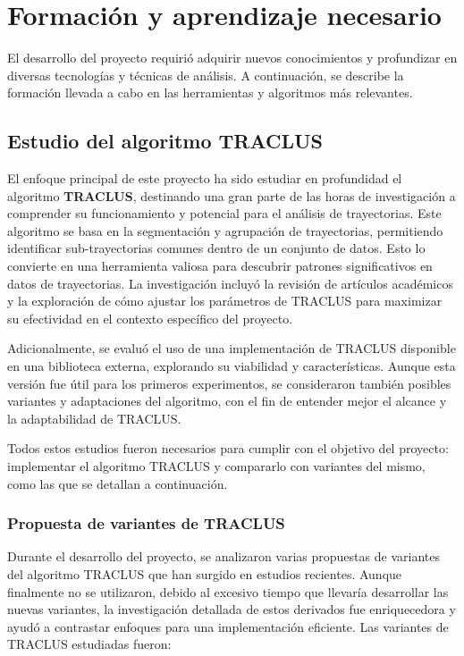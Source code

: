 
\section{Formación y aprendizaje necesario}

El desarrollo del proyecto requirió adquirir nuevos conocimientos y profundizar en diversas tecnologías y técnicas de análisis. A continuación, se describe la formación llevada a cabo en las herramientas y algoritmos más relevantes.

\subsection{Estudio del algoritmo TRACLUS}

El enfoque principal de este proyecto ha sido estudiar en profundidad el algoritmo \textbf{TRACLUS}, destinando una gran parte de las horas de investigación a comprender su funcionamiento y potencial para el análisis de trayectorias. Este algoritmo se basa en la segmentación y agrupación de trayectorias, permitiendo identificar sub-trayectorias comunes dentro de un conjunto de datos. Esto lo convierte en una herramienta valiosa para descubrir patrones significativos en datos de trayectorias. La investigación incluyó la revisión de artículos académicos y la exploración de cómo ajustar los parámetros de TRACLUS para maximizar su efectividad en el contexto específico del proyecto.

Adicionalmente, se evaluó el uso de una implementación de TRACLUS disponible en una biblioteca externa, explorando su viabilidad y características. Aunque esta versión fue útil para los primeros experimentos, se consideraron también posibles variantes y adaptaciones del algoritmo, con el fin de entender mejor el alcance y la adaptabilidad de TRACLUS.

Todos estos estudios fueron necesarios para cumplir con el objetivo del proyecto: implementar el algoritmo TRACLUS y compararlo con variantes del mismo, como las que se detallan a continuación.

\subsubsection{Propuesta de variantes de TRACLUS}

Durante el desarrollo del proyecto, se analizaron varias propuestas de variantes del algoritmo TRACLUS que han surgido en estudios recientes. Aunque finalmente no se utilizaron, debido al excesivo tiempo que llevaría desarrollar las nuevas variantes, la investigación detallada de estos derivados fue enriquecedora y ayudó a contrastar enfoques para una implementación eficiente. Las variantes de TRACLUS estudiadas fueron:

